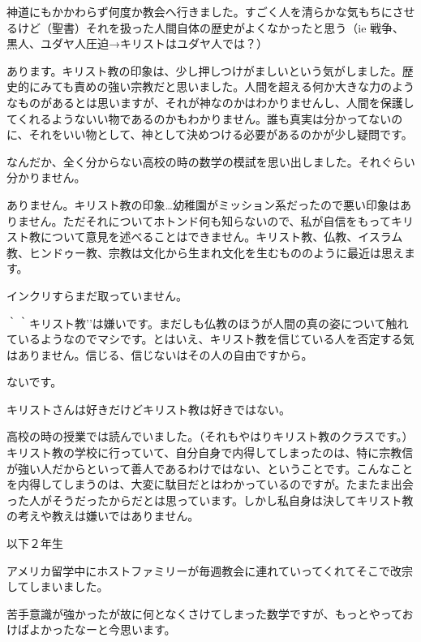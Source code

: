 \item
神道にもかかわらず何度か教会へ行きました。すごく人を清らかな気もちにさせるけど（聖書）それを扱った人間自体の歴史がよくなかったと思う（ie 戦争、黒人、ユダヤ人圧迫→キリストはユダヤ人では？）

\item
あります。キリスト教の印象は、少し押しつけがましいという気がしました。歴史的にみても責めの強い宗教だと思いました。人間を超える何か大きな力のようなものがあるとは思いますが、それが神なのかはわかりませんし、人間を保護してくれるようないい物であるのかもわかりません。誰も真実は分かってないのに、それをいい物として、神として決めつける必要があるのかが少し疑問です。

なんだか、全く分からない高校の時の数学の模試を思い出しました。それぐらい分かりません。

\item
ありません。キリスト教の印象…幼稚園がミッション系だったので悪い印象はありません。ただそれについてホトンド何も知らないので、私が自信をもってキリスト教について意見を述べることはできません。キリスト教、仏教、イスラム教、ヒンドゥー教、宗教は文化から生まれ文化を生むもののように最近は思えます。

\item
インクリすらまだ取っていません。

｀｀キリスト教’’は嫌いです。まだしも仏教のほうが人間の真の姿について触れているようなのでマシです。とはいえ、キリスト教を信じている人を否定する気はありません。信じる、信じないはその人の自由ですから。

\item
ないです。

キリストさんは好きだけどキリスト教は好きではない。

\item
高校の時の授業では読んでいました。（それもやはりキリスト教のクラスです。）キリスト教の学校に行っていて、自分自身で内得してしまったのは、特に宗教信が強い人だからといって善人であるわけではない、ということです。こんなことを内得してしまうのは、大変に駄目だとはわかっているのですが。たまたま出会った人がそうだったからだとは思っています。しかし私自身は決してキリスト教の考えや教えは嫌いではありません。

\smallskip
以下２年生

\item
アメリカ留学中にホストファミリーが毎週教会に連れていってくれてそこで改宗してしまいました。

\item
苦手意識が強かったが故に何となくさけてしまった数学ですが、もっとやっておけばよかったなーと今思います。

